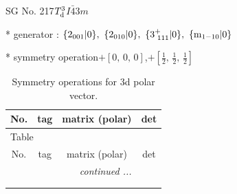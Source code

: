 \documentclass[fleqn,8pt]{jsarticle}
\begin{document}
\setcounter{MaxMatrixCols}{32}

\renewcommand{\tablename}{Table~}
\renewcommand{\figurename}{Figure~}
\begin{center}
\LARGE
SG No. 217\quad$T_{\rm d}^{3}$\quad$I\bar{4}3m$\quad[ cubic ]
\end{center}

* generator : $\{2{}_{001}|0\},\,\,\{2{}_{010}|0\},\,\,\{3^{+}_{\,\,111}|0\},\,\,\{{\rm m}_{1-10}|0\}$

* symmetry operation\quad$+\left[ 0,\, 0,\, 0 \right]$,\quad $+\left[ \frac{1}{2},\, \frac{1}{2},\, \frac{1}{2} \right]$
\renewcommand{\arraystretch}{1.3}
\begin{longtable}{cccc}
\caption{Symmetry operations for 3d polar vector.}
 \\
 \hline \hline
No. & tag & matrix (polar) & det \\ \hline \endfirsthead

\multicolumn{3}{l}{\tablename\ \thetable{}} \\
 \hline \hline
No. & tag & matrix (polar) & det \\ \hline \endhead

 \hline \hline
\multicolumn{3}{r}{\footnotesize\it continued ...} \\ \endfoot

 \hline \hline
\multicolumn{3}{r}{} \\ \endlastfoot


\end{longtable}
\end{document}
